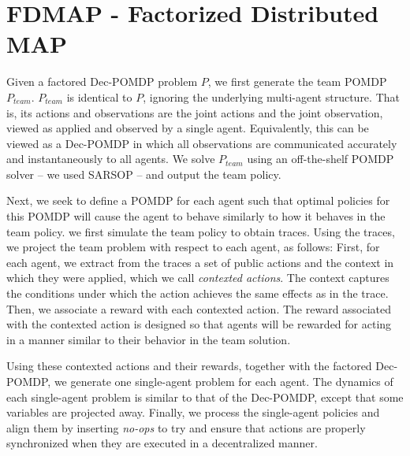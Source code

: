 \documentclass[letterpaper]{article}
\theoremstyle{definition}
\begin{document}
\section{FDMAP - Factorized Distributed MAP}

Given a factored Dec-POMDP problem $P$, we first generate the team POMDP $P_{team}$. $P_{team}$ is identical to $P$, ignoring the underlying multi-agent structure. That is, its actions and observations are the joint actions and the joint observation, viewed as applied and observed by a single agent. Equivalently, this can be viewed as a Dec-POMDP in which all observations are communicated accurately and instantaneously to all agents. 
We solve $P_{team}$ using an off-the-shelf POMDP solver -- we used SARSOP \cite{SARSOP} -- and output the team policy. 

Next, we seek to define a POMDP for each agent such that optimal
policies for this POMDP will cause the agent to behave similarly to how it behaves in the team policy. 
we first simulate the team policy to obtain traces. 
Using the traces, we project the team problem with respect to each agent, as follows:
First, for each agent, we extract from the traces a set of public actions and the context in which they were applied, which we call {\em contexted actions}. The context captures the conditions under which the action achieves the same effects as in the trace. Then, we associate a reward with each contexted action. The reward associated with the contexted action is designed so that agents will be rewarded for acting in a manner similar to their
behavior in the team solution. 

Using these contexted actions and their rewards, together with the factored Dec-POMDP, we  generate
one single-agent problem for each agent. The dynamics of each single-agent problem is similar to that of the Dec-POMDP, except that some variables are projected away. 
Finally, we process the single-agent policies and align them by inserting {\em no-ops} to try and ensure that actions are properly synchronized when they are executed in a decentralized manner. 
\end{document}
